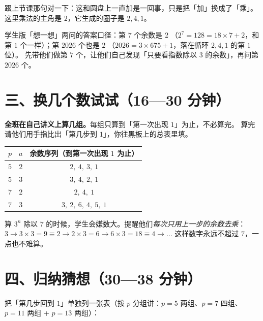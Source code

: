 跟上节课那句对一下：这和圆盘上一直加是一回事，只是把「加」换成了「乘」。
这里乘法的主角是 \(2\)，它生成的圈子是 \(2,4,1\)。

\begin{zhu}
  学生版「想一想」两问的答案口径：第 \(7\) 个余数是 \(2\)
  （\(2^{7}=128=18\times7+2\)，和第 \(1\) 个一样）；第 \(2026\) 个也是 \(2\)
  （\(2026=3\times675+1\)，落在循环 \(2,4,1\) 的第 \(1\) 位）。
  先带他们做第 \(7\) 个，让他们自己发现「只要看指数除以 \(3\) 的余数」，再问第 \(2026\) 个。
\end{zhu}

\section*{三、换几个数试试（16—30 分钟）}

\begin{caozuo}
  \textbf{全班在自己讲义上算几组。}每组只算到「第一次出现 \(1\)」为止，不必算完。
  算完请他们用手指比出「第几步到 \(1\)」，你往黑板上的总表里填。
\end{caozuo}

\begin{center}
\begin{tabular}{@{}ccc@{}}
  \toprule
  \(p\) & \(a\) & 余数序列（到第一次出现 \(1\) 为止） \\
  \midrule
  \(5\) & \(2\) & \(2,\ 4,\ 3,\ 1\) \\
  \(5\) & \(3\) & \(3,\ 4,\ 2,\ 1\) \\
  \(7\) & \(2\) & \(2,\ 4,\ 1\) \\
  \(7\) & \(3\) & \(3,\ 2,\ 6,\ 4,\ 5,\ 1\) \\
  \bottomrule
\end{tabular}
\end{center}

\begin{zhu}
  算 \(3^n\) 除以 \(7\) 的时候，学生会嫌数大。提醒他们\emph{每次只用上一步的余数去乘}：
  \(3\to3\times3=9\equiv2\to2\times3=6\to6\times3=18\equiv4\to\dots\)
  这样数字永远不超过 \(7\)，一点也不难算。
\end{zhu}

\section*{四、归纳猜想（30—38 分钟）}

把「第几步回到 \(1\)」单独列一张表（按 \(p\) 分组讲：\(p=5\) 两组、\(p=7\) 四组、\(p=11\) 两组 + \(p=13\) 两组）：

